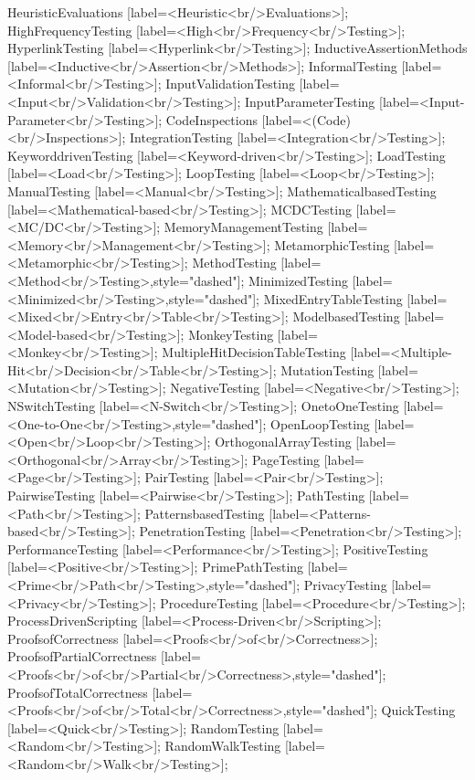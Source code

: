 \documentclass{article}
\begin{document}
{HeuristicEvaluations [label=<Heuristic<br/>Evaluations>];
HighFrequencyTesting [label=<High<br/>Frequency<br/>Testing>];
HyperlinkTesting [label=<Hyperlink<br/>Testing>];
InductiveAssertionMethods [label=<Inductive<br/>Assertion<br/>Methods>];
InformalTesting [label=<Informal<br/>Testing>];
InputValidationTesting [label=<Input<br/>Validation<br/>Testing>];
InputParameterTesting [label=<Input-Parameter<br/>Testing>];
CodeInspections [label=<(Code)<br/>Inspections>];
IntegrationTesting [label=<Integration<br/>Testing>];
KeyworddrivenTesting [label=<Keyword-driven<br/>Testing>];
LoadTesting [label=<Load<br/>Testing>];
LoopTesting [label=<Loop<br/>Testing>];
ManualTesting [label=<Manual<br/>Testing>];
MathematicalbasedTesting [label=<Mathematical-based<br/>Testing>];
MCDCTesting [label=<MC/DC<br/>Testing>];
MemoryManagementTesting [label=<Memory<br/>Management<br/>Testing>];
MetamorphicTesting [label=<Metamorphic<br/>Testing>];
MethodTesting [label=<Method<br/>Testing>,style="dashed"];
MinimizedTesting [label=<Minimized<br/>Testing>,style="dashed"];
MixedEntryTableTesting [label=<Mixed<br/>Entry<br/>Table<br/>Testing>];
ModelbasedTesting [label=<Model-based<br/>Testing>];
MonkeyTesting [label=<Monkey<br/>Testing>];
MultipleHitDecisionTableTesting [label=<Multiple-Hit<br/>Decision<br/>Table<br/>Testing>];
MutationTesting [label=<Mutation<br/>Testing>];
NegativeTesting [label=<Negative<br/>Testing>];
NSwitchTesting [label=<N-Switch<br/>Testing>];
OnetoOneTesting [label=<One-to-One<br/>Testing>,style="dashed"];
OpenLoopTesting [label=<Open<br/>Loop<br/>Testing>];
OrthogonalArrayTesting [label=<Orthogonal<br/>Array<br/>Testing>];
PageTesting [label=<Page<br/>Testing>];
PairTesting [label=<Pair<br/>Testing>];
PairwiseTesting [label=<Pairwise<br/>Testing>];
PathTesting [label=<Path<br/>Testing>];
PatternsbasedTesting [label=<Patterns-based<br/>Testing>];
PenetrationTesting [label=<Penetration<br/>Testing>];
PerformanceTesting [label=<Performance<br/>Testing>];
PositiveTesting [label=<Positive<br/>Testing>];
PrimePathTesting [label=<Prime<br/>Path<br/>Testing>,style="dashed"];
PrivacyTesting [label=<Privacy<br/>Testing>];
ProcedureTesting [label=<Procedure<br/>Testing>];
ProcessDrivenScripting [label=<Process-Driven<br/>Scripting>];
ProofsofCorrectness [label=<Proofs<br/>of<br/>Correctness>];
ProofsofPartialCorrectness [label=<Proofs<br/>of<br/>Partial<br/>Correctness>,style="dashed"];
ProofsofTotalCorrectness [label=<Proofs<br/>of<br/>Total<br/>Correctness>,style="dashed"];
QuickTesting [label=<Quick<br/>Testing>];
RandomTesting [label=<Random<br/>Testing>];
RandomWalkTesting [label=<Random<br/>Walk<br/>Testing>];
}
\end{document}
